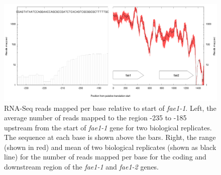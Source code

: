 \begin{figure}[H]
\centering
     \includegraphics[width=1.0\textwidth]{./tex/chapter1/figures/supplemental/FigureS5.png}
     \begin{singlespace}
     \caption[RNA-Seq reads mapped per base relative to start of \textit{fae1-1}]{
        RNA-Seq reads mapped per base relative to start of \textit{fae1-1}.
        Left, the average number of reads mapped to the region -235 to -185 upstream from the start of \textit{fae1-1} gene for two biological replicates.
        The sequence at each base is shown above the bars.
        Right, the range (shown in red) and mean of two biological replicates (shown as black line) for the number of reads mapped per base for the coding and downstream region
            of the \textit{fae1-1} and \textit{fae1-2} genes.
        }
     \label{fig:S5} %
     \end{singlespace}
\end{figure}


